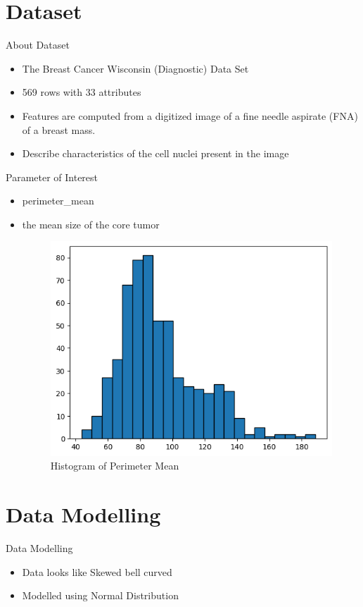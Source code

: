 \section{Dataset}

\begin{frame}{About Dataset}
\begin{itemize}
    \item The Breast Cancer Wisconsin (Diagnostic) Data Set
    \item 569 rows with 33 attributes
    \item Features are computed from a digitized image of a fine needle aspirate (FNA) of a breast mass.
    \item Describe characteristics of the cell nuclei present in the image
\end{itemize}
  
\end{frame}

\begin{frame}{Parameter of Interest}
\begin{itemize}
    \item perimeter\_mean
    \item the mean size of the core tumor
    \vspace{0.25in}
    \begin{figure}
        \centering
        \includegraphics[width=0.5\linewidth]{Project1/Report/images/data-hist.png}
        \caption{Histogram of Perimeter Mean}
        \label{fig:enter-label}
    \end{figure}
\end{itemize}
  
\end{frame}

\section{Data Modelling}

\begin{frame}{Data Modelling}
\begin{itemize}
    \item Data looks like Skewed bell curved
    \item Modelled using Normal Distribution
\end{itemize}
  
\end{frame}

